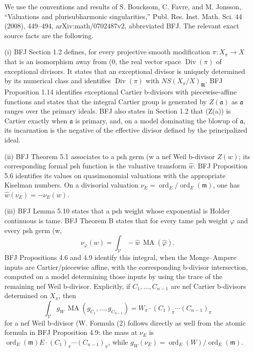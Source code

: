 We use the conventions and results of S. Boucksom, C. Favre, and M. Jonsson,
``Valuations and plurisubharmonic singularities,'' Publ. Res. Inst. Math.
Sci. 44 (2008), 449--494, arXiv:math/0702487v2, abbreviated BFJ.  The
relevant exact source facts are the following.

(i) BFJ Section 1.2 defines, for every projective smooth modification
\(\pi:X_\pi\to X\) that is an isomorphism away from (0\), the real vector
space \(\operatorname{Div}(\pi)\) of exceptional divisors.  It states that
an exceptional divisor is uniquely determined by its numerical class and
identifies \(\operatorname{Div}(\pi)\) with
\(NS(X_\pi/X)_{\mathbf R}\).  BFJ Proposition 1.14 identifies exceptional
Cartier b-divisors with piecewise-affine functions and states that the
integral Cartier group is generated by \(Z(\mathfrak a)\) as
\(\mathfrak a\) ranges over the primary ideals.  BFJ also states in Section
1.2 that (Z(\mathfrak a)) is Cartier exactly when \(\mathfrak a\) is
primary, and, on a model dominating the blowup of \(\mathfrak a\), its
incarnation is the negative of the effective divisor defined by the
principalized ideal.

(ii) BFJ Theorem 5.1 associates to a psh germ (w\) a nef Weil b-divisor
\(Z(w)\); its corresponding formal psh function is the valuative transform
\(\widehat w\).  BFJ Proposition 5.6 identifies its values on
quasimonomial valuations with the appropriate Kiselman numbers.  On a
divisorial valuation \(\nu_E=\operatorname{ord}_E/
\operatorname{ord}_E(\mathfrak m)\), one has
\(\widehat w(\nu_E)=-\nu_E(w)\).

(iii) BFJ Lemma 5.10 states that a psh weight whose exponential is Holder
continuous is tame.  BFJ Theorem B states that for every tame psh weight
\(\varphi\) and every psh germ (w\),
\[
 \nu_\varphi(w)=\int_{\mathcal V}-\widehat w\,
                    \operatorname{MA}(\widehat\varphi).
\tag{1}
\]
BFJ Propositions 4.6 and 4.9 identify this integral, when the
Monge--Ampere inputs are Cartier/piecewise affine, with the corresponding
b-divisor intersection, computed on a model determining those inputs by
using the trace of the remaining nef Weil b-divisor.  Explicitly, if
\(C_1,\ldots,C_{n-1}\) are nef Cartier b-divisors determined on \(X_\pi\),
then
\[
 \int_{\mathcal V}g_W\,
   \operatorname{MA}(g_{C_1},\ldots,g_{C_{n-1}})
 =W_\pi\cdot(C_1)_\pi\cdots(C_{n-1})_\pi
\tag{2}
\]
for a nef Weil b-divisor (W\).  Formula (2) follows directly as well from
the atomic formula in BFJ Proposition 4.9: the mass at
\(\nu_E\) is
\(\operatorname{ord}_E(\mathfrak m)
 E\cdot(C_1)_\pi\cdots(C_{n-1})_\pi\), while
\(g_W(\nu_E)=\operatorname{ord}_E(W)/
\operatorname{ord}_E(\mathfrak m)\).

